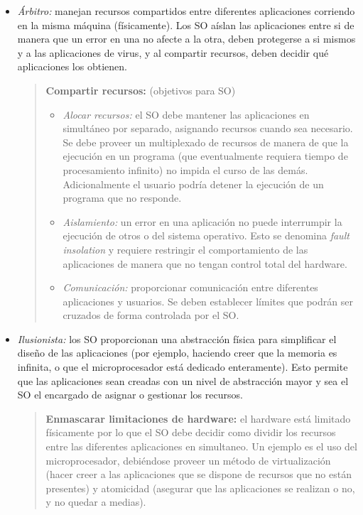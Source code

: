 \documentclass[a4paper,10pt,spanish]{article}
\begin{document}
\begin{itemize} %
\item \textit{Árbitro:} manejan recursos compartidos entre diferentes aplicaciones corriendo en la misma máquina (físicamente). Los SO aíslan las aplicaciones entre si de manera que un error en una no afecte a la otra, deben protegerse a si mismos y a las aplicaciones de virus, y al compartir recursos, deben decidir qué aplicaciones los obtienen.

\begin{quote}

\textbf{Compartir recursos:} (objetivos para SO)

	\begin{itemize}
	\item \textit{Alocar recursos:} el SO debe mantener las aplicaciones en simultáneo 	por separado, asignando recursos cuando sea necesario. Se debe proveer un 				multiplexado de recursos de manera de que la ejecución en un programa (que 				eventualmente requiera tiempo de procesamiento infinito) no impida el curso de las 	demás. Adicionalmente el usuario podría detener la ejecución de un programa que no 	responde.
	
	\item \textit{Aislamiento:} un error en una aplicación no puede interrumpir la 			ejecución de otros o del sistema operativo. Esto se denomina \textit{fault 				insolation} y requiere restringir el comportamiento de las aplicaciones de manera 		que no tengan control total del hardware.
	
	\item \textit{Comunicación:} proporcionar comunicación entre diferentes 				aplicaciones y usuarios. Se deben establecer límites que podrán ser cruzados de 		forma controlada por el SO.
	\end{itemize}

\end{quote}

\item \textit{Ilusionista:} los SO proporcionan una abstracción física para simplificar el diseño de las aplicaciones (por ejemplo, haciendo creer que la memoria es infinita, o que el microprocesador está dedicado enteramente). Esto permite que las aplicaciones sean creadas con un nivel de abstracción mayor y sea el SO el encargado de asignar o gestionar los recursos.

\begin{quote}

\textbf{Enmascarar limitaciones de hardware:} el hardware está limitado físicamente por lo que el SO debe decidir como dividir los recursos entre las diferentes aplicaciones en simultaneo. Un ejemplo es el uso del microprocesador, debiéndose proveer un método de virtualización (hacer creer a las aplicaciones que se dispone de recursos que no están presentes) y atomicidad (asegurar que las aplicaciones se realizan o no, y no quedar a medias).


\end{quote}
\end{itemize}
\end{document}
